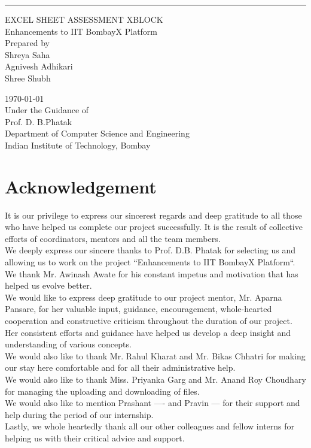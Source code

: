 \documentclass{scrreprt}
\date{}
\begin{document}
\begin{flushright}
    \rule{14cm}{4pt}\vskip1cm
    
        \Huge{EXCEL SHEET ASSESSMENT XBLOCK}\\
        
        \vspace{1.0cm}
        Enhancements to IIT BombayX Platform\\
        \vspace{1.3cm}
        Prepared by \\Shreya Saha\\Agnivesh Adhikari\\Shree Shubh\\
        \vspace{1.3cm}
       
        
        \today\\
    \vspace{0.7cm}
    Under the Guidance of\\
{\Huge Prof. D. B.Phatak}\\
{\normalsize Department of Computer Science and Engineering\\
Indian Institute of Technology, Bombay\\ }
\end{flushright}

\tableofcontents

\chapter{Acknowledgement}

It is our privilege to express our sincerest regards and deep
gratitude to all those who have helped us complete our project
successfully. It is the result of collective efforts of coordinators,
mentors and all the team members.\\
We deeply express our sincere thanks to Prof. D.B. Phatak for
selecting us and allowing us to work on the project “Enhancements to IIT BombayX Platform“.\\
We thank Mr. Awinash Awate for his constant impetus and
motivation that has helped us evolve better.\\
We would like to express deep gratitude to our project mentor,
Mr. Aparna Pansare, for her
valuable input, guidance, encouragement, whole-hearted
cooperation and constructive criticism throughout the duration
of our project. Her consistent efforts and guidance have
helped us develop a deep insight and understanding of various
concepts.\\
We would also like to thank Mr. Rahul Kharat and Mr. Bikas
Chhatri for making our stay here comfortable and for all their
administrative help.\\
We would also like to thank Miss. Priyanka Garg and Mr. Anand
Roy Choudhary for managing the uploading and downloading of files.\\
We would also like to mention Prashant ---- and Pravin --- for their support and help 
during the period of our internship.\\
Lastly, we whole heartedly thank all our other colleagues and
fellow interns for helping us with their critical advice and
support.
\end{document}
